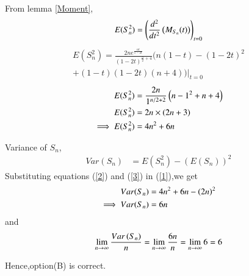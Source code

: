 \documentclass[journal,12pt,twocolumn]{IEEEtran}
\begin{document}
From lemma \ref{Moment},
\begin{align}
  E(S_{n}^2)=\left(\frac{d^{2}}{dt^{2}}\left(M_{S_{n}}(t)\right)\right)_{t=0}
\end{align}
\begin{multline}
 E(S_{n}^2)=\frac{2ne^{\frac{nt}{1-2t}}}{(1-2t)^{\frac{n}{2}+4}}(n(1-t)-(1-2t)^{2}\\
 +(1-t)(1-2t)(n+4))|_{t=0}
\end{multline}
\begin{align}
E(S_{n}^2)&=\frac{2n}{1^{n/2+2}}\left(n-1^2+n+4\right)
\\E(S_{n}^2)&=2n\times(2n+3)
\\\implies E(S_{n}^2)&=4n^{2}+6n
\label{3}
\end{align}

Variance of $S_{n}$,
\begin{align}
Var(S_{n})&=E(S_{n}^2)-(E(S_{n}))^2
\label{1}
\end{align}
Substituting equations (\ref{2}) and (\ref{3}) in (\ref{1}),we get 
\begin{align}
    Var(S_{n})&=4n^{2}+6n-\left(2n\right)^{2}
\\ \implies Var(S_{n})&=6n
\end{align}
and
$$\lim_{n \to \infty}{\frac{Var\left(S_{n}\right)}{n}}=\lim_{n \to \infty}{\frac{6n}{n}}=\lim_{n \to \infty}{6}=6$$

Hence,option(B) is correct.
    
 
\end{document}
